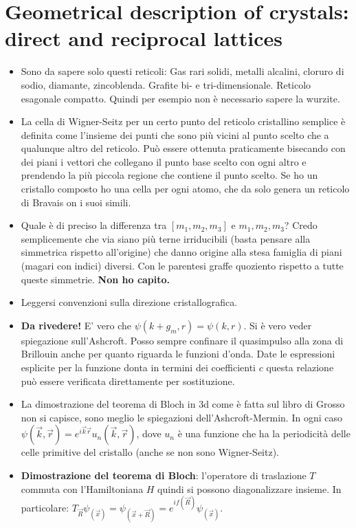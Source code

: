 \documentclass[10pt,a4paper]{article}
\begin{document}
\section{Geometrical description of crystals: direct and
reciprocal lattices}
\begin{itemize}
\item Sono da sapere solo questi reticoli: Gas rari solidi, metalli alcalini, cloruro di sodio, diamante, zincoblenda. Grafite bi- e tri-dimensionale. Reticolo esagonale compatto. Quindi per esempio non è necessario sapere la wurzite.
\item La cella di Wigner-Seitz per un certo punto del reticolo cristallino semplice è definita come l'insieme dei punti che sono più vicini al punto scelto che a qualunque altro del reticolo. Può essere ottenuta praticamente bisecando con dei piani i vettori che collegano il punto base scelto con ogni altro e prendendo la più piccola regione che contiene il punto scelto. Se ho un cristallo composto ho una cella per ogni atomo, che da solo genera un reticolo di Bravais on i suoi simili.
\item Quale è di preciso la differenza tra $[m_1, m_2, m_3]$ e ${m_1, m_2, m_3}$? Credo semplicemente che via siano più terne irriducibili (basta pensare alla simmetrica rispetto all'origine) che danno origine alla stesa famiglia di piani (magari con indici) diversi. Con le parentesi graffe quoziento rispetto a tutte queste simmetrie. \textbf{Non ho capito.}
\item Leggersi convenzioni sulla direzione cristallografica.
\item \textbf{Da rivedere!} E' vero che $\psi (k+g_m, r) = \psi(k, r)$. Si è vero veder spiegazione sull'Ashcroft. Posso sempre confinare il quasimpulso alla zona di Brillouin anche per quanto riguarda le funzioni d'onda. Date le espressioni esplicite per la funzione donta in termini dei coefficienti $c$ questa relazione può essere verificata direttamente per sostituzione.
\item La dimostrazione del teorema di Bloch in 3d come è fatta sul libro di Grosso non si capisce, sono meglio le spiegazioni dell'Ashcroft-Mermin. In ogni caso $\psi(\vec{k}, \vec{r}) = e^{i \vec{k} \vec{r}} u_n (\vec{k}, \vec{r})$, dove $u_n$ è una funzione che ha la periodicità delle celle primitive del cristallo (anche se non sono Wigner-Seitz). 
\item \textbf{Dimostrazione del teorema di Bloch}: l'operatore di traslazione $T$ commuta con l'Hamiltoniana $H$ quindi si possono diagonalizzare insieme. In particolare: $T_{\vec{R}} \psi_(\vec{x}) = \psi_(\vec{x} + \vec{R}) = e^{i f(\vec{R})} \psi_(\vec{x})$. 

\end{itemize}
\end{document}
